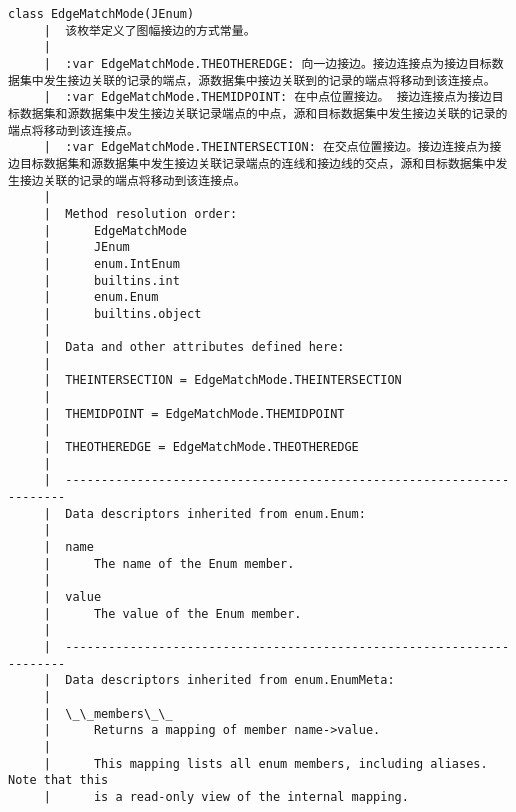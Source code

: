\documentclass[11pt]{article}
\begin{document}
\begin{Verbatim}[commandchars=\\\{\}]
    class EdgeMatchMode(JEnum)
     |  该枚举定义了图幅接边的方式常量。
     |  
     |  :var EdgeMatchMode.THEOTHEREDGE: 向一边接边。接边连接点为接边目标数据集中发生接边关联的记录的端点，源数据集中接边关联到的记录的端点将移动到该连接点。
     |  :var EdgeMatchMode.THEMIDPOINT: 在中点位置接边。 接边连接点为接边目标数据集和源数据集中发生接边关联记录端点的中点，源和目标数据集中发生接边关联的记录的端点将移动到该连接点。
     |  :var EdgeMatchMode.THEINTERSECTION: 在交点位置接边。接边连接点为接边目标数据集和源数据集中发生接边关联记录端点的连线和接边线的交点，源和目标数据集中发生接边关联的记录的端点将移动到该连接点。
     |  
     |  Method resolution order:
     |      EdgeMatchMode
     |      JEnum
     |      enum.IntEnum
     |      builtins.int
     |      enum.Enum
     |      builtins.object
     |  
     |  Data and other attributes defined here:
     |  
     |  THEINTERSECTION = EdgeMatchMode.THEINTERSECTION
     |  
     |  THEMIDPOINT = EdgeMatchMode.THEMIDPOINT
     |  
     |  THEOTHEREDGE = EdgeMatchMode.THEOTHEREDGE
     |  
     |  ----------------------------------------------------------------------
     |  Data descriptors inherited from enum.Enum:
     |  
     |  name
     |      The name of the Enum member.
     |  
     |  value
     |      The value of the Enum member.
     |  
     |  ----------------------------------------------------------------------
     |  Data descriptors inherited from enum.EnumMeta:
     |  
     |  \_\_members\_\_
     |      Returns a mapping of member name->value.
     |      
     |      This mapping lists all enum members, including aliases. Note that this
     |      is a read-only view of the internal mapping.
    

\end{Verbatim}
\end{document}
